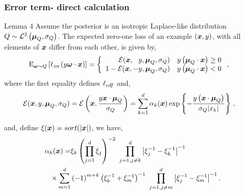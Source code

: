 \documentclass[mathserif]{beamer}
\begin{document}
\begin{frame}
\frametitle{ Error term- direct calculation  }
\begin{block}{Lemma 4}
Assume the posterior is an isotropic Laplace-like
distribution
${Q} \sim{\mathcal{L}}^2\left({{\boldsymbol{\mu}}_Q,{\sigma_{Q}}}\right)$.
The expected zero-one loss  of an example $({\boldsymbol{x}},y)$, with all elements of ${\boldsymbol{x}}$
differ from each other, is given by,
\vspace{-0.35cm}
\begin{align*} 
&{\rm E}_{{\boldsymbol{\omega}}\sim{Q}}\left[{ \ell_{zo} \left({ y{\boldsymbol{\omega}} \cdot {\boldsymbol{x}} }\right)  }\right] =
\left\{
\begin{array}{rl}
{\mathcal{E}}({\boldsymbol{x}},~~ y, {\boldsymbol{\mu}}_Q, {\sigma_{Q}})    &  y \left({ {\boldsymbol{\mu}}_Q \cdot {\boldsymbol{x}}
}\right) \geq 0\\ 
1-{\mathcal{E}}({\boldsymbol{x}}, -y, {\boldsymbol{\mu}}_Q, {\sigma_{Q}}) & y \left({ {\boldsymbol{\mu}}_Q \cdot {\boldsymbol{x}}
}\right) < 0 
\end{array}
\right.,
\end{align*}
\vspace{-0.07cm}
where the first equality  %
defines 
$\ell_{cdf}$ and,
\vspace{-0.3cm}
\begin{align*}
 &{\mathcal{E}}({\boldsymbol{x}}, y, {\boldsymbol{\mu}}_Q, {\sigma_{Q}})={\mathcal{E}}\left({{\boldsymbol{x}}, \frac{y{\boldsymbol{x}}\cdot{\boldsymbol{\mu}}_Q}{{\sigma_{Q}}}}\right)  = \sum_{k=1}^{d} \alpha_{k}({\boldsymbol{x}})\exp{\left\{{-\frac{ y \left({ {\boldsymbol{x}}\cdot {\boldsymbol{\mu}}_Q}\right) }{{\sigma_{Q}}| x_{k}  |} }\right\}  }~, 
\end{align*}
\vspace{-0.5cm}

 and,  define $\xi({\boldsymbol{x}})=sort(\left\vert{{\boldsymbol{x}}}\right\vert)$, we have,
 \vspace{-0.3cm}
 \begin{align*}
\alpha_{k}({\boldsymbol{x}}) =& \xi_k\left({ \prod_{j=1}^{d} \xi_j }\right)^{-2}\  \prod_{j=1,j\neq k  }^{d} \left\vert{ \xi_j^{-1}-\xi_k^{-1} }\right\vert^{-1}  \nonumber \\ 
\times \sum_{m=1}^{d}& \left({-1}\right)^{m+k}\left({ \xi_k^{-1}+\xi_m^{-1}}\right)^{-1}\  \prod_{j=1,j\neq m  }^{d} \left\vert{ \xi_j^{-1}-\xi_m^{-1} }\right\vert^{-1}.
\end{align*} 
\vspace{-0.5cm}
\end{block}
\end{frame}
\end{document}
